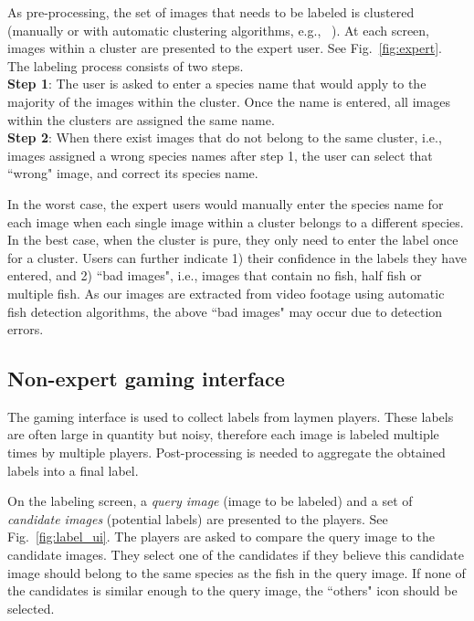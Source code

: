 \documentclass{sig-alternate}
\begin{document}

As pre-processing, the set of images that needs to be labeled is clustered (manually or with automatic clustering algorithms, e.g., ~\cite{boom12:supp}). 
At each screen, images within a cluster are presented to the expert user. 
See Fig.~\ref{fig:expert}. 
%
The labeling process consists of two steps. \\
\textbf{Step 1}: The user is asked to enter a species name that would apply to the majority of 
the images within the cluster. Once the name is entered, all images within the clusters are 
assigned the same name. \\
\textbf{Step 2}: When there exist images that do not belong to the same cluster, i.e., %
images assigned a wrong species names after step 1, the user can select that ``wrong" image, and correct
its species name. 

In the worst case,  the expert users would manually enter the species name for each image when 
each single image within a cluster belongs to a different species. 
In the best case, when the cluster is pure, they only need to enter the label once for a cluster. 
Users can further indicate 1) their confidence in the labels they have entered, and
2) ``bad images", i.e., images that contain no fish, half fish or multiple fish.
As our images are extracted from video footage using automatic fish detection algorithms, 
the above ``bad images" may occur due to detection errors. 

\subsection*{Non-expert gaming interface}
The gaming interface is used to collect labels from laymen players. 
These labels are often large in quantity but noisy, 
therefore each image is labeled multiple times by multiple players. 
Post-processing is needed to aggregate the obtained labels into a final label. 

On the labeling screen, a \emph{query image} (image to be labeled) and a set of \emph{candidate images} (potential labels) 
are presented to the players. See Fig.~\ref{fig:label_ui}. 
%
The players are asked to compare the query image to the candidate images. 
They select one of the candidates if they believe
this candidate image should belong to the same species as the fish in the query image. 
If none of the candidates is similar enough to the query image, the ``others"  icon should be selected.
\end{document}
